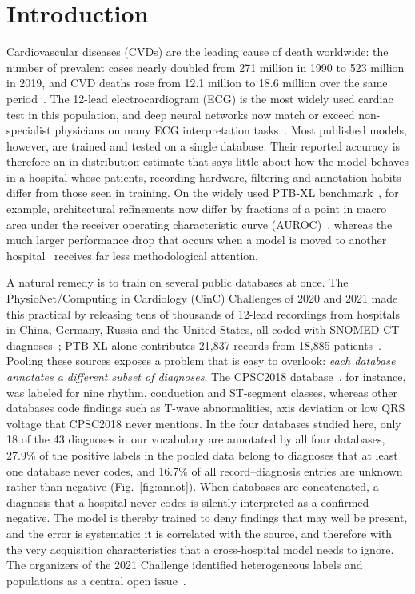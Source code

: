 \section{Introduction}\label{sec:intro}

Cardiovascular diseases (CVDs) are the leading cause of death worldwide: the number of prevalent cases nearly doubled from 271 million in 1990 to 523 million in 2019, and CVD deaths rose from 12.1 million to 18.6 million over the same period~\cite{roth2020gbd}. The 12-lead electrocardiogram (ECG) is the most widely used cardiac test in this population, and deep neural networks now match or exceed non-specialist physicians on many ECG interpretation tasks~\cite{hannun2019,ribeiro2020,siontis2021}. Most published models, however, are trained and tested on a single database. Their reported accuracy is therefore an in-distribution estimate that says little about how the model behaves in a hospital whose patients, recording hardware, filtering and annotation habits differ from those seen in training. On the widely used PTB-XL benchmark~\cite{wagner2020,strodthoff2021}, for example, architectural refinements now differ by fractions of a point in macro area under the receiver operating characteristic curve (AUROC)~\cite{sharan2025,zhou_leadgraph2026}, whereas the much larger performance drop that occurs when a model is moved to another hospital~\cite{reyna2022,ballas2022} receives far less methodological attention.

A natural remedy is to train on several public databases at once. The PhysioNet/Computing in Cardiology (CinC) Challenges of 2020 and 2021 made this practical by releasing tens of thousands of 12-lead recordings from hospitals in China, Germany, Russia and the United States, all coded with SNOMED-CT diagnoses~\cite{perez2020,reyna2022}; PTB-XL alone contributes 21{,}837 records from 18{,}885 patients~\cite{wagner2020}. Pooling these sources exposes a problem that is easy to overlook: \emph{each database annotates a different subset of diagnoses}. The CPSC2018 database~\cite{liu_cpsc2018}, for instance, was labeled for nine rhythm, conduction and ST-segment classes, whereas other databases code findings such as T-wave abnormalities, axis deviation or low QRS voltage that CPSC2018 never mentions. In the four databases studied here, only 18 of the 43 diagnoses in our vocabulary are annotated by all four databases, 27.9\% of the positive labels in the pooled data belong to diagnoses that at least one database never codes, and 16.7\% of all record--diagnosis entries are unknown rather than negative (Fig.~\ref{fig:annot}). When databases are concatenated, a diagnosis that a hospital never codes is silently interpreted as a confirmed negative. The model is thereby trained to deny findings that may well be present, and the error is systematic: it is correlated with the source, and therefore with the very acquisition characteristics that a cross-hospital model needs to ignore. The organizers of the 2021 Challenge identified heterogeneous labels and populations as a central open issue~\cite{reyna2022}.

